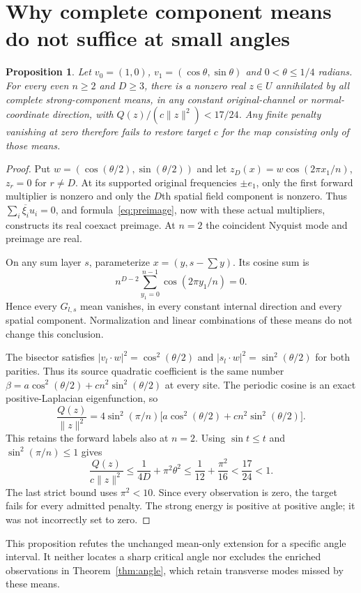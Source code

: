 \documentclass[11pt,a4paper]{article}
\newtheorem{proposition}[theorem]{Proposition}
\newcommand{\norm}[1]{\lVert#1\rVert}
\begin{document}
\section{Why complete component means do not suffice at small angles}
\begin{proposition}\label{prop:smallangle}
Let $v_0=(1,0)$, $v_1=(\cos\theta,\sin\theta)$ and
$0<\theta\leq1/4$ radians. For every even $n\geq2$ and $D\geq3$, there is a
nonzero real $z\in U$ annihilated by all complete strong-component means,
in any constant original-channel or normal-coordinate direction, with
$Q(z)/(c\norm z^2)<17/24$. Any finite penalty vanishing at zero therefore
fails to restore target $c$ for the map consisting only of those means.
\end{proposition}
\begin{proof}
Put $w=(\cos(\theta/2),\sin(\theta/2))$ and let
$z_D(x)=w\cos(2\pi x_1/n)$, $z_r=0$ for $r\ne D$.
At its supported original frequencies $\pm e_1$, only the first forward
multiplier is nonzero and only the $D$th spatial field component is nonzero.
Thus $\sum_i\overline{\xi_i}u_i=0$, and formula~\eqref{eq:preimage}, now
with these actual multipliers, constructs its real coexact preimage. At
$n=2$ the coincident Nyquist mode and preimage are real.

On any sum layer $s$, parameterize $x=(y,s-\sum y)$. Its cosine sum is
\[
 n^{D-2}\sum_{y_1=0}^{n-1}\cos(2\pi y_1/n)=0.
\]
Hence every $G_{l,s}$
mean vanishes, in every constant internal direction and every spatial
component. Normalization and linear combinations of these means do not
change this conclusion.

The bisector satisfies
$|v_l\cdot w|^2=\cos^2(\theta/2)$ and
$|s_l\cdot w|^2=\sin^2(\theta/2)$ for both parities. Thus its source
quadratic coefficient is the same number
$\beta=a\cos^2(\theta/2)+cn^2\sin^2(\theta/2)$ at every site.
The periodic cosine is an exact positive-Laplacian eigenfunction, so
\[
 \frac{Q(z)}{\norm z^2}=4\sin^2(\pi/n)
 \bigl[a\cos^2(\theta/2)+cn^2\sin^2(\theta/2)\bigr].
\]
This retains the forward labels also at $n=2$. Using $\sin t\leq t$ and
$\sin^2(\pi/n)\leq1$ gives
\[
 \frac{Q(z)}{c\norm z^2}\leq\frac1{4D}+\pi^2\theta^2
 \leq\frac1{12}+\frac{\pi^2}{16}<\frac{17}{24}<1.
\]
The last strict bound uses $\pi^2<10$. Since every observation is zero,
the target fails for every admitted penalty. The strong energy is positive
at positive angle; it was not incorrectly set to zero.
\end{proof}

This proposition refutes the unchanged mean-only extension for a specific
angle interval. It neither locates a sharp critical angle nor excludes the
enriched observations in Theorem~\ref{thm:angle}, which retain transverse
modes missed by these means.
\end{document}
